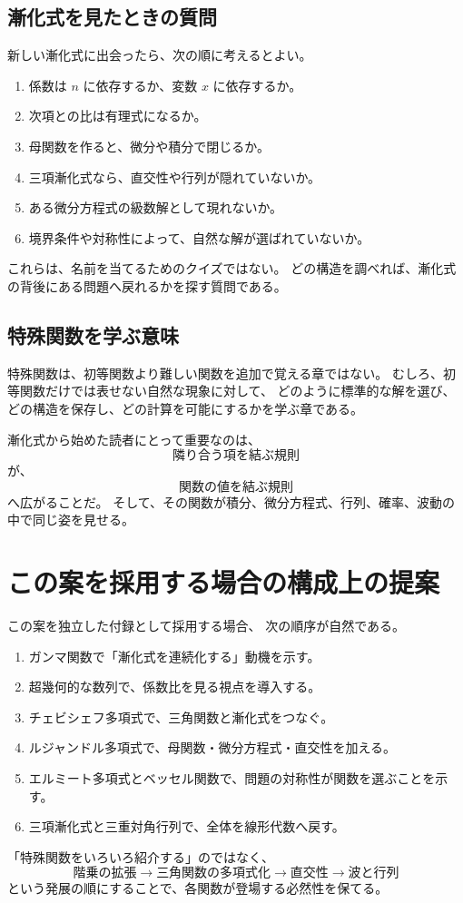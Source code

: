 \subsection{漸化式を見たときの質問}

新しい漸化式に出会ったら、次の順に考えるとよい。

\begin{enumerate}
  \item 係数は $n$ に依存するか、変数 $x$ に依存するか。
  \item 次項との比は有理式になるか。
  \item 母関数を作ると、微分や積分で閉じるか。
  \item 三項漸化式なら、直交性や行列が隠れていないか。
  \item ある微分方程式の級数解として現れないか。
  \item 境界条件や対称性によって、自然な解が選ばれていないか。
\end{enumerate}

これらは、名前を当てるためのクイズではない。
どの構造を調べれば、漸化式の背後にある問題へ戻れるかを探す質問である。

\subsection{特殊関数を学ぶ意味}

特殊関数は、初等関数より難しい関数を追加で覚える章ではない。
むしろ、初等関数だけでは表せない自然な現象に対して、
どのように標準的な解を選び、どの構造を保存し、どの計算を可能にするかを学ぶ章である。

漸化式から始めた読者にとって重要なのは、
\[
  \text{隣り合う項を結ぶ規則}
\]
が、
\[
  \text{関数の値を結ぶ規則}
\]
へ広がることだ。
そして、その関数が積分、微分方程式、行列、確率、波動の中で同じ姿を見せる。

\section*{この案を採用する場合の構成上の提案}

この案を独立した付録として採用する場合、
次の順序が自然である。

\begin{enumerate}
  \item ガンマ関数で「漸化式を連続化する」動機を示す。
  \item 超幾何的な数列で、係数比を見る視点を導入する。
  \item チェビシェフ多項式で、三角関数と漸化式をつなぐ。
  \item ルジャンドル多項式で、母関数・微分方程式・直交性を加える。
  \item エルミート多項式とベッセル関数で、問題の対称性が関数を選ぶことを示す。
  \item 三項漸化式と三重対角行列で、全体を線形代数へ戻す。
\end{enumerate}

「特殊関数をいろいろ紹介する」のではなく、
\[
  \text{階乗の拡張}
  \longrightarrow
  \text{三角関数の多項式化}
  \longrightarrow
  \text{直交性}
  \longrightarrow
  \text{波と行列}
\]
という発展の順にすることで、各関数が登場する必然性を保てる。
